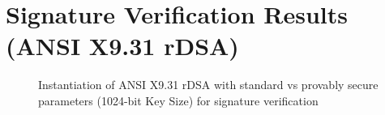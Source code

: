 \documentclass[]{final_report}
\theoremstyle{definition}
\begin{document}

\section{Signature Verification Results (ANSI X9.31 rDSA)}

\begin{figure}[H]
    \centering %
     \caption{Instantiation of ANSI X9.31 rDSA with standard vs provably secure parameters (1024-bit Key Size) for signature verification}
    \begin{minipage}{\textwidth}
        \centering
    \end{minipage}
       \label{ansi_verify_1024bit_table}
  \end{figure}
  
\end{document}
